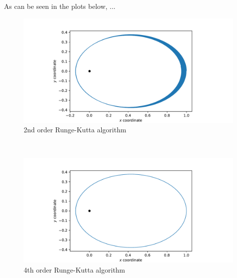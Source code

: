     As can be seen in the plots below, ...
    \begin{figure}[h!]
        \centering
        \includegraphics[width=\textwidth]{./figures/task1_1_orbit_rk2.pdf}
        \caption{2nd order Runge-Kutta algorithm}
    \end{figure} \ \\ 
    \begin{figure}[h!]
        \centering
        \includegraphics[width=\textwidth]{./figures/task1_1_orbit_rk4.pdf}
        \caption{4th order Runge-Kutta algorithm}
    \end{figure} \ \\ 

    \newpage
